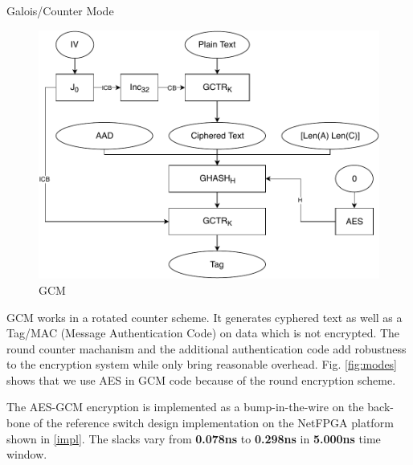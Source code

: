 \documentclass[final]{beamer}
\newlength{\onecolwid}
\newlength{\twocolwid}
\begin{document}
\begin{frame}[t]
\begin{columns}[t]
\begin{column}{\twocolwid} %

\begin{columns}[t,totalwidth=\twocolwid] %

\begin{column}{\onecolwid}\vspace{-.6in} %


\begin{block}{Galois/Counter Mode}

\begin{figure}
\includegraphics[width=1\linewidth]{poster/GCM.pdf}
\caption{GCM}
\label{fig:gcm}
\end{figure}
GCM works in a rotated counter scheme. It generates cyphered text as well as a Tag/MAC (Message Authentication Code) on data which is not encrypted. The round counter machanism and the additional authentication code add robustness to the encryption system while only bring reasonable overhead.
Fig. \ref{fig:modes} shows that we use AES in GCM code because of the round encryption scheme.

The AES-GCM encryption is implemented as a bump-in-the-wire on the back-
bone of the reference switch design implementation on the NetFPGA platform shown in \ref{impl}.
The slacks vary from \textbf{0.078ns} to \textbf{0.298ns} in \textbf{5.000ns} time window.


\end{block}
\end{column}
\end{columns}
\end{column}
\end{columns}
\end{frame}
\end{document}
